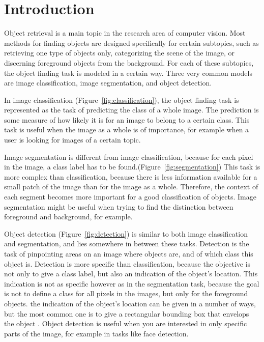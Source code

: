 \section{Introduction} %
\label{cha:introduction}

Object retrieval is a main topic in the research area of computer vision. Most methods for finding objects are designed specifically for certain subtopics, such as retrieving one type of objects only, categorizing the scene of the image, or discerning foreground objects from the background. For each of these subtopics, the object finding task is modeled in a certain way. Three very common models are image classification, image segmentation, and object detection.

In image classification (Figure~\ref{fig:classification}), the object finding task is represented as the task of predicting the class of a whole image. The prediction is some measure of how likely it is for an image to belong to a certain class. This task is useful when the image as a whole is of importance, for example when a user is looking for images of a certain topic.

Image segmentation is different from image classification, because for each pixel in the image, a class label has to be found.(Figure~\ref{fig:segmentation}) This task is more complex than classification, because there is less information available for a small patch of the image than for the image as a whole. Therefore, the context of each segment becomes more important for a good classification of objects. Image segmentation might be useful when trying to find the distinction between foreground and background, for example.

Object detection (Figure~\ref{fig:detection}) is similar to both image classification and segmentation, and lies somewhere in between these tasks. Detection is the task of pinpointing areas on an image where objects are, and of which class this object is. Detection is more specific than classification, because the objective is not only to give a class label, but also an indication of the object's location. This indication is not as specific however as in the segmentation task, because the goal is not to define a class for all pixels in the images, but only for the foreground objects. the indication of the object's location can be given in a number of ways, but the most common one is to give a rectangular bounding box that envelops the object \cite{pascal-voc-2007}. Object detection is useful when you are interested in only specific parts of the image, for example in tasks like face detection.

